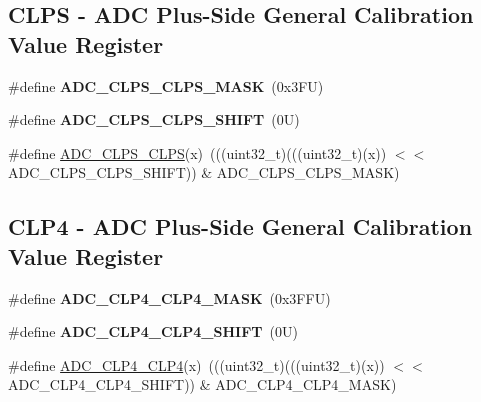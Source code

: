 \subsection*{C\+L\+PS -\/ A\+DC Plus-\/\+Side General Calibration Value Register}
\begin{DoxyCompactItemize}
\item 
\mbox{\label{group___a_d_c___register___masks_gaccedf61066feb0b1c6d6bd7794d2a79c}} 
\#define {\bfseries A\+D\+C\+\_\+\+C\+L\+P\+S\+\_\+\+C\+L\+P\+S\+\_\+\+M\+A\+SK}~(0x3\+F\+U)
\item 
\mbox{\label{group___a_d_c___register___masks_ga94f5e6c337622e8c4b8d03201e1c2d11}} 
\#define {\bfseries A\+D\+C\+\_\+\+C\+L\+P\+S\+\_\+\+C\+L\+P\+S\+\_\+\+S\+H\+I\+FT}~(0\+U)
\item 
\#define \mbox{\hyperlink{group___a_d_c___register___masks_ga7b8e212b6c7c8504784c5af551e2b6bd}{A\+D\+C\+\_\+\+C\+L\+P\+S\+\_\+\+C\+L\+PS}}(x)~(((uint32\+\_\+t)(((uint32\+\_\+t)(x)) $<$$<$ A\+D\+C\+\_\+\+C\+L\+P\+S\+\_\+\+C\+L\+P\+S\+\_\+\+S\+H\+I\+FT)) \& A\+D\+C\+\_\+\+C\+L\+P\+S\+\_\+\+C\+L\+P\+S\+\_\+\+M\+A\+SK)
\end{DoxyCompactItemize}
\subsection*{C\+L\+P4 -\/ A\+DC Plus-\/\+Side General Calibration Value Register}
\begin{DoxyCompactItemize}
\item 
\mbox{\label{group___a_d_c___register___masks_ga877d163ca4067627ebb29125d75eb757}} 
\#define {\bfseries A\+D\+C\+\_\+\+C\+L\+P4\+\_\+\+C\+L\+P4\+\_\+\+M\+A\+SK}~(0x3\+F\+F\+U)
\item 
\mbox{\label{group___a_d_c___register___masks_gaee16600c1dd7fefead073d24320818a4}} 
\#define {\bfseries A\+D\+C\+\_\+\+C\+L\+P4\+\_\+\+C\+L\+P4\+\_\+\+S\+H\+I\+FT}~(0\+U)
\item 
\#define \mbox{\hyperlink{group___a_d_c___register___masks_gac1366655a895ce73fc06cd74002258a5}{A\+D\+C\+\_\+\+C\+L\+P4\+\_\+\+C\+L\+P4}}(x)~(((uint32\+\_\+t)(((uint32\+\_\+t)(x)) $<$$<$ A\+D\+C\+\_\+\+C\+L\+P4\+\_\+\+C\+L\+P4\+\_\+\+S\+H\+I\+FT)) \& A\+D\+C\+\_\+\+C\+L\+P4\+\_\+\+C\+L\+P4\+\_\+\+M\+A\+SK)
\end{DoxyCompactItemize}
